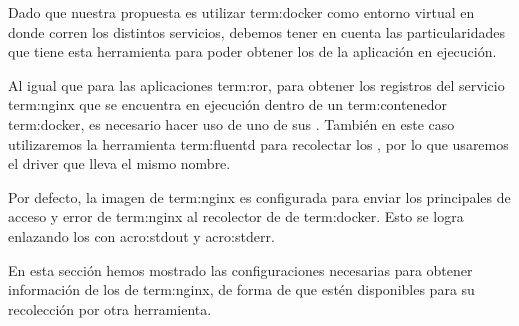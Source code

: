 Dado que nuestra propuesta es utilizar \gls{term:docker} como entorno virtual
en donde corren los distintos servicios, debemos tener en cuenta las
particularidades que tiene esta herramienta para poder obtener los  de
la aplicación en ejecución.

Al igual que para las aplicaciones \gls{term:ror}, para obtener los registros
del servicio \gls{term:nginx} que se encuentra en ejecución dentro de un
\gls{term:contenedor} \gls{term:docker}, es necesario hacer uso de uno de sus
. También en este caso utilizaremos la herramienta
\gls{term:fluentd} para recolectar los , por lo que usaremos el driver
que lleva el mismo nombre.

Por defecto, la imagen de \gls{term:nginx} es configurada para enviar los
 principales de acceso y error de \gls{term:nginx} al recolector de
 de \gls{term:docker}. Esto se logra enlazando los  con
\gls{acro:stdout} y \gls{acro:stderr}.

En esta sección hemos mostrado las configuraciones necesarias para obtener
información de los  de \gls{term:nginx}, de forma de que estén
disponibles para su recolección por otra herramienta.
